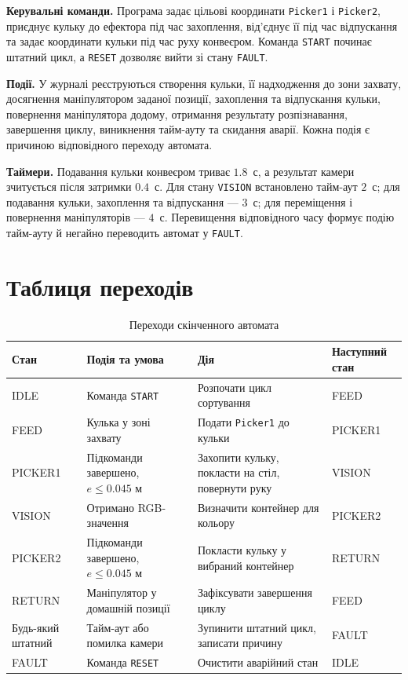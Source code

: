 \documentclass[12pt,a4paper]{article}
\begin{document}
\textbf{Керувальні команди.} Програма задає цільові координати
\texttt{Picker1} і \texttt{Picker2}, приєднує кульку до ефектора під час
захоплення, від'єднує її під час відпускання та задає координати кульки
під час руху конвеєром. Команда \texttt{START} починає штатний цикл, а
\texttt{RESET} дозволяє вийти зі стану \texttt{FAULT}.

\Needspace{0.32\textheight}
\textbf{Події.} У журналі реєструються створення кульки, її надходження
до зони захвату, досягнення маніпулятором заданої позиції, захоплення та
відпускання кульки, повернення маніпулятора додому, отримання результату
розпізнавання, завершення циклу, виникнення тайм-ауту та скидання аварії.
Кожна подія є причиною відповідного переходу автомата.

\textbf{Таймери.} Подавання кульки конвеєром триває $1.8$~с, а результат
камери зчитується після затримки $0.4$~с. Для стану \texttt{VISION}
встановлено тайм-аут $2$~с; для подавання кульки, захоплення та
відпускання --- $3$~с; для переміщення і повернення маніпуляторів ---
$4$~с. Перевищення відповідного часу формує подію тайм-ауту й негайно
переводить автомат у \texttt{FAULT}.

\Needspace{0.55\textheight}
\section{Таблиця переходів}
\begin{table}[H]
\centering\small\setlength{\tabcolsep}{4pt}
\begin{tabularx}{\textwidth}{@{}p{}p{}Yp{0.16\textwidth}@{}}
\toprule
\textbf{Стан} & \textbf{Подія та умова} & \textbf{Дія} & \textbf{Наступний стан} \\
\midrule
IDLE & Команда \texttt{START} & Розпочати цикл сортування & FEED \\
FEED & Кулька у зоні захвату & Подати \texttt{Picker1} до кульки & PICKER1 \\
PICKER1 & Підкоманди завершено, $e\leq0.045$ м & Захопити кульку, покласти на стіл, повернути руку & VISION \\
VISION & Отримано RGB-значення & Визначити контейнер для кольору & PICKER2 \\
PICKER2 & Підкоманди завершено, $e\leq0.045$ м & Покласти кульку у вибраний контейнер & RETURN \\
RETURN & Маніпулятор у домашній позиції & Зафіксувати завершення циклу & FEED \\
Будь-який штатний & Тайм-аут або помилка камери & Зупинити штатний цикл, записати причину & FAULT \\
FAULT & Команда \texttt{RESET} & Очистити аварійний стан & IDLE \\
\bottomrule
\end{tabularx}
\caption{Переходи скінченного автомата}
\label{tab:transitions}
\end{table}
\end{document}
